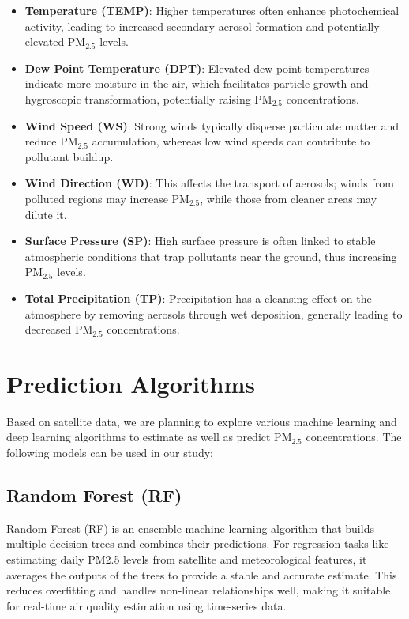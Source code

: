\documentclass[12pt]{report}
\begin{document}
\begin{itemize}
    \item \textbf{Temperature (TEMP)}: Higher temperatures often enhance photochemical activity, leading to increased secondary aerosol formation and potentially elevated PM$_{2.5}$ levels.
    
    \item \textbf{Dew Point Temperature (DPT)}: Elevated dew point temperatures indicate more moisture in the air, which facilitates particle growth and hygroscopic transformation, potentially raising PM$_{2.5}$ concentrations.
    
    \item \textbf{Wind Speed (WS)}: Strong winds typically disperse particulate matter and reduce PM$_{2.5}$ accumulation, whereas low wind speeds can contribute to pollutant buildup.
    
    \item \textbf{Wind Direction (WD)}: This affects the transport of aerosols; winds from polluted regions may increase PM$_{2.5}$, while those from cleaner areas may dilute it.
    
    \item \textbf{Surface Pressure (SP)}: High surface pressure is often linked to stable atmospheric conditions that trap pollutants near the ground, thus increasing PM$_{2.5}$ levels.
    
    \item \textbf{Total Precipitation (TP)}: Precipitation has a cleansing effect on the atmosphere by removing aerosols through wet deposition, generally leading to decreased PM$_{2.5}$ concentrations.
\end{itemize}

\section{Prediction Algorithms}

Based on satellite data, we are planning to explore various machine learning and deep learning algorithms to estimate as well as predict PM$_{2.5}$ concentrations. The following models can be used in our study:

\subsection{Random Forest (RF)}

Random Forest (RF) is an ensemble machine learning algorithm that builds multiple decision trees and combines their predictions. For regression tasks like estimating daily PM2.5 levels from satellite and meteorological features, it averages the outputs of the trees to provide a stable and accurate estimate. This reduces overfitting and handles non-linear relationships well, making it suitable for real-time air quality estimation using time-series data.
\end{document}
